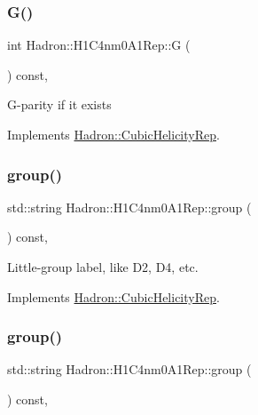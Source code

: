 \subsubsection{\texorpdfstring{G()}{G()}\hspace{0.1cm}{\footnotesize\ttfamily [3/3]}}
{\footnotesize\ttfamily int Hadron\+::\+H1\+C4nm0\+A1\+Rep\+::G (\begin{DoxyParamCaption}{ }\end{DoxyParamCaption}) const\hspace{0.3cm}{\ttfamily [inline]}, {\ttfamily [virtual]}}

G-\/parity if it exists 

Implements \mbox{\hyperlink{structHadron_1_1CubicHelicityRep_a50689f42be1e6170aa8cf6ad0597018b}{Hadron\+::\+Cubic\+Helicity\+Rep}}.

\mbox{\label{structHadron_1_1H1C4nm0A1Rep_a5f7db1ef15b67eaee1c5fc81ed9ec2bd}} 
\subsubsection{\texorpdfstring{group()}{group()}\hspace{0.1cm}{\footnotesize\ttfamily [1/5]}}
{\footnotesize\ttfamily std\+::string Hadron\+::\+H1\+C4nm0\+A1\+Rep\+::group (\begin{DoxyParamCaption}{ }\end{DoxyParamCaption}) const\hspace{0.3cm}{\ttfamily [inline]}, {\ttfamily [virtual]}}

Little-\/group label, like D2, D4, etc. 

Implements \mbox{\hyperlink{structHadron_1_1CubicHelicityRep_a101a7d76cd8ccdad0f272db44b766113}{Hadron\+::\+Cubic\+Helicity\+Rep}}.

\mbox{\label{structHadron_1_1H1C4nm0A1Rep_a5f7db1ef15b67eaee1c5fc81ed9ec2bd}} 
\subsubsection{\texorpdfstring{group()}{group()}\hspace{0.1cm}{\footnotesize\ttfamily [2/5]}}
{\footnotesize\ttfamily std\+::string Hadron\+::\+H1\+C4nm0\+A1\+Rep\+::group (\begin{DoxyParamCaption}{ }\end{DoxyParamCaption}) const\hspace{0.3cm}{\ttfamily [inline]}, {\ttfamily [virtual]}}


